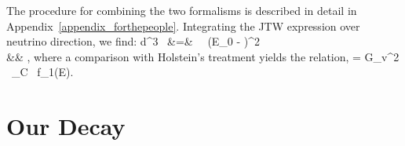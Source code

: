 	
	The procedure for combining the two formalisms is described in detail in Appendix~\ref{appendix_forthepeople}.  
Integrating the JTW expression over neutrino direction, we find:
\bea
	\textrm{d}^3 \Gamma \dEe \, \dOmegae
	&=& 
	 \, \FF \, \pe \Ee (E_0 - \Ee)^2 \, \dEe \, \dOmegae \, \xi \nonumber\\ 
	&& \times {},
\label{equation:integrated_jtw_INTRODUCTION}
\eea
where a comparison with Holstein's treatment yields the relation,
\bea
\xi = G_v^2 \, \cos\theta_C \, f_1(E).
\eea
{}



\section{Our Decay}

